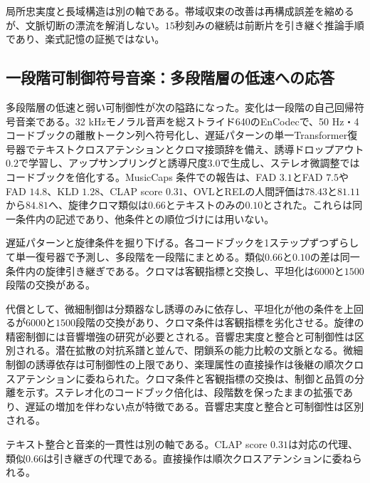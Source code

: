 \documentclass[lualatex,a4paper,10pt]{jlreq}
\begin{document}
局所忠実度と長域構造は別の軸である。帯域収束の改善は再構成誤差を縮めるが、文脈切断の漂流を解消しない\autocite{btd063}。$15$秒刻みの継続は前断片を引き継ぐ推論手順であり、楽式記憶の証拠ではない\autocite{btd065}。

\subsection{一段階可制御符号音楽：多段階層の低速への応答}
多段階層の低速と弱い可制御性が次の隘路になった\autocite{btd066}。変化は一段階の自己回帰符号音楽である\autocite{btd066}。32 kHzモノラル音声を総ストライド640のEnCodecで、50 Hz・4コードブックの離散トークン列へ符号化し、遅延パターンの単一Transformer復号器でテキストクロスアテンションとクロマ接頭辞を備え、誘導ドロップアウト$0.2$で学習し、アップサンプリングと誘導尺度$3.0$で生成し、ステレオ微調整ではコードブックを倍化する\autocite{btd066}。MusicCaps 条件での報告は、FAD $3.1$とFAD $7.5$やFAD $14.8$、KLD $1.28$、CLAP score $0.31$、OVLとRELの人間評価は$78.43$と$81.11$から$84.81$へ、旋律クロマ類似は$0.66$とテキストのみの$0.10$とされた\autocite{btd066}。これらは同一条件内の記述であり、他条件との順位づけには用いない\autocite{btd066}。

遅延パターンと旋律条件を掘り下げる。各コードブックを1ステップずつずらして単一復号器で予測し、多段階を一段階にまとめる\autocite{btd066}。類似$0.66$と$0.10$の差は同一条件内の旋律引き継ぎである\autocite{btd066}。クロマは客観指標と交換し、平坦化は$6000$と$1500$段階の交換がある\autocite{btd066}。

代償として、微細制御は分類器なし誘導のみに依存し、平坦化が他の条件を上回るが$6000$と$1500$段階の交換があり、クロマ条件は客観指標を劣化させる\autocite{btd066}。旋律の精密制御には音響増強の研究が必要とされる\autocite{btd066}。音響忠実度と整合と可制御性は区別される\autocite{btd066}。潜在拡散の対抗系譜と並んで、閉鎖系の能力比較の文脈となる\autocite{btd066,btd067}。微細制御の誘導依存は可制御性の上限であり、楽理属性の直接操作は後継の順次クロスアテンションに委ねられた\autocite{btd066,btd069}。クロマ条件と客観指標の交換は、制御と品質の分離を示す\autocite{btd066}。ステレオ化のコードブック倍化は、段階数を保ったままの拡張であり、遅延の増加を伴わない点が特徴である\autocite{btd066}。音響忠実度と整合と可制御性は区別される\autocite{btd066}。

テキスト整合と音楽的一貫性は別の軸である。CLAP score $0.31$は対応の代理、類似$0.66$は引き継ぎの代理である\autocite{btd066}。直接操作は順次クロスアテンションに委ねられる\autocite{btd066,btd069}。
\end{document}
